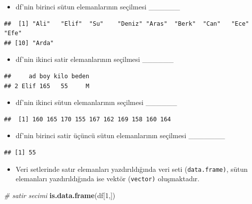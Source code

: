 \documentclass[
  oneside]{book}
\newenvironment{Shaded}{\begin{snugshade}}{\end{snugshade}}
\newcommand{\CommentTok}[1]{\textcolor[rgb]{0.56,0.35,0.01}{\textit{#1}}}
\newcommand{\DecValTok}[1]{\textcolor[rgb]{0.00,0.00,0.81}{#1}}
\newcommand{\FunctionTok}[1]{\textcolor[rgb]{0.13,0.29,0.53}{\textbf{#1}}}
\newcommand{\NormalTok}[1]{#1}
\providecommand{\tightlist}{%
  \setlength{\itemsep}{0pt}\setlength{\parskip}{0pt}}
\begin{document}
\begin{itemize}
\tightlist
\item
  df'nin birinci sütun elemanlarının seçilmesi \_\_\_\_\_\_
\end{itemize}

\begin{verbatim}
##  [1] "Ali"   "Elif"  "Su"    "Deniz" "Aras"  "Berk"  "Can"   "Ece"   "Efe"  
## [10] "Arda"
\end{verbatim}

\begin{itemize}
\tightlist
\item
  df'nin ikinci satir elemanlarının seçilmesi \_\_\_\_\_\_
\end{itemize}

\begin{verbatim}
##     ad boy kilo beden
## 2 Elif 165   55     M
\end{verbatim}

\begin{itemize}
\tightlist
\item
  df'nin ikinci sütun elemanlarının seçilmesi \_\_\_\_\_\_
\end{itemize}

\begin{verbatim}
##  [1] 160 165 170 155 167 162 169 158 160 164
\end{verbatim}

\begin{itemize}
\tightlist
\item
  df'nin birinci satir üçüncü sütun elemanlarının seçilmesi \_\_\_\_\_\_\_
\end{itemize}

\begin{verbatim}
## [1] 55
\end{verbatim}

\begin{itemize}
\tightlist
\item
  Veri setlerinde satır elemanları yazdırıldığında veri seti (\texttt{data.frame)}, sütun elemanları yazdırıldığında ise vektör (\texttt{vector)} oluşmaktadır.
\end{itemize}

\begin{Shaded}
\begin{Highlighting}[]
\CommentTok{\# satir secimi}
\FunctionTok{is.data.frame}\NormalTok{(df[}\DecValTok{1}\NormalTok{,])}
\end{Highlighting}
\end{Shaded}
\end{document}
